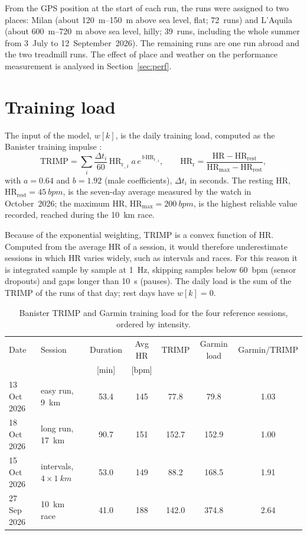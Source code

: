\documentclass[11pt,a4paper]{article}
\begin{document}
From the GPS position at the start of each run, the runs were assigned to two
places: Milan (about \SIrange{120}{150}{m} above sea level, flat; 72~runs) and
L'Aquila (about \SIrange{600}{720}{m} above sea level, hilly; 39~runs,
including the whole summer from 3~July to 12~September~2026). The remaining
runs are one run abroad and the two treadmill runs. The effect of place and
weather on the performance measurement is analysed in Section~\ref{sec:perf}.

\section{Training load}\label{sec:load}

The input of the model, $w[k]$, is the daily training load, computed as the
Banister training impulse \citep{banister1991}:
\begin{equation}
\mathrm{TRIMP} = \sum_i \frac{\Delta t_i}{60}\, \mathrm{HR_r}_{,i}\; a\, e^{\,b\, \mathrm{HR_r}_{,i}},
\qquad
\mathrm{HR_r} = \frac{\mathrm{HR}-\mathrm{HR_{rest}}}{\mathrm{HR_{max}}-\mathrm{HR_{rest}}},
\label{eq:trimp}
\end{equation}
with $a=0.64$ and $b=1.92$ (male coefficients), $\Delta t_i$ in seconds.
The resting HR, $\mathrm{HR_{rest}} = \SI{45}{bpm}$, is the seven-day average
measured by the watch in October~2026; the maximum HR,
$\mathrm{HR_{max}} = \SI{200}{bpm}$, is the highest reliable value recorded,
reached during the \SI{10}{km} race.

Because of the exponential weighting, TRIMP is a convex function of HR.
Computed from the average HR of a session, it would therefore underestimate
sessions in which HR varies widely, such as intervals and races. For this
reason it is integrated sample by sample at \SI{1}{Hz}, skipping samples below
\SI{60}{bpm} (sensor dropouts) and gaps longer than \SI{10}{s} (pauses). The
daily load is the sum of the TRIMP of the runs of that day; rest days have
$w[k]=0$.

\begin{table}[ht]
\centering
\caption{Banister TRIMP and Garmin training load for the four reference
sessions, ordered by intensity.}
\label{tab:loadcompare}
\small
\begin{tabular}{@{}llccccc@{}}
\toprule
Date & Session & Duration & Avg HR & TRIMP & Garmin load & Garmin/TRIMP \\
     &         & [min]    & [bpm]  &       &             &              \\
\midrule
13 Oct 2026 & easy run, \SI{9}{km}      & 53.4 & 145 &  77.8 &  79.8 & 1.03 \\
18 Oct 2026 & long run, \SI{17}{km}     & 90.7 & 151 & 152.7 & 152.9 & 1.00 \\
15 Oct 2026 & intervals, $4\times\SI{1}{km}$ & 53.0 & 149 &  88.2 & 168.5 & 1.91 \\
27 Sep 2026 & \SI{10}{km} race          & 41.0 & 188 & 142.0 & 374.8 & 2.64 \\
\bottomrule
\end{tabular}
\end{table}
\end{document}
